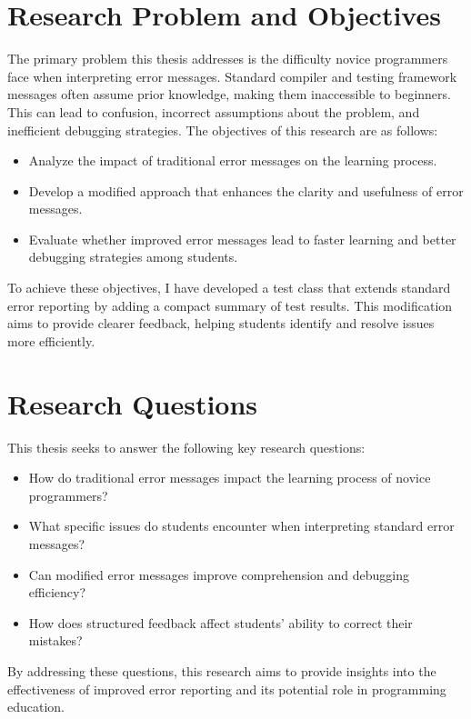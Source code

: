 \section{Research Problem and Objectives} %




The primary problem this thesis addresses is the difficulty novice programmers face when interpreting error messages.
Standard compiler and testing framework messages often assume prior knowledge, making them inaccessible to beginners.
This can lead to confusion, incorrect assumptions about the problem, and inefficient debugging strategies.
The objectives of this research are as follows:
\begin{itemize}
    \item Analyze the impact of traditional error messages on the learning process.
    \item Develop a modified approach that enhances the clarity and usefulness of error messages.
    \item Evaluate whether improved error messages lead to faster learning and better debugging strategies among students.
\end{itemize}
To achieve these objectives, I have developed a test class that extends standard error reporting by adding a compact summary of test results.
This modification aims to provide clearer feedback, helping students identify and resolve issues more efficiently.


\section{Research Questions} %




This thesis seeks to answer the following key research questions:
\begin{itemize}
    \item How do traditional error messages impact the learning process of novice programmers?
    \item What specific issues do students encounter when interpreting standard error messages?
    \item Can modified error messages improve comprehension and debugging efficiency?
    \item How does structured feedback affect students' ability to correct their mistakes?
\end{itemize}
By addressing these questions, this research aims to provide insights into the effectiveness of improved error reporting and
its potential role in programming education.



